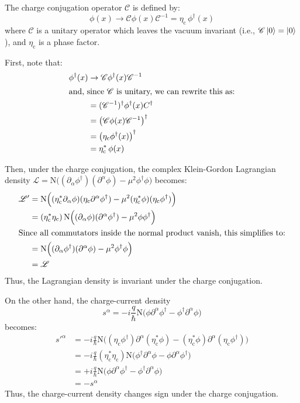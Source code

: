 \documentclass[letterpaper,12pt]{article}
\newenvironment{problem}{\subsection{}\begin{adjustwidth}{0.25in}{}\vspace{-\baselineskip}}{\end{adjustwidth}}
\newcommand{\lagr}{\mathscr{L}}
\begin{document}
\begin{problem}
The charge conjugation operator $\mathscr{C}$ is defined by:
\begin{equation*}
	\phi(x) \longrightarrow \mathscr{C}\phi(x)\mathscr{C}^{-1} = \eta_\text{c} \, \phi^\dagger(x)
\end{equation*}
where $\mathscr{C}$ is a unitary operator which leaves the vacuum invariant (i.e., $\mathscr{C}\ket{0} = \ket{0}$), and $\eta_\text{c}$ is a phase factor.

First, note that:
\begin{align*}
	\phi^\dagger(x) &\rightarrow \mathscr{C}\phi^\dagger(x)\mathscr{C}^{-1}	\\
\intertext{and, since $\mathscr{C}$ is unitary, we can rewrite this as:}
	&= (\mathscr{C}^{-1})^\dagger \phi^\dagger(x) C^\dagger	\\
	&= \left(\mathscr{C} \phi(x) \mathscr{C}^{-1}\right)^\dagger	\\
	&= \left(\eta_\text{c} \phi^\dagger(x)\right)^\dagger	\\
	&= \eta_\text{c}^* \, \phi(x)
\end{align*}

Then, under the charge conjugation, the complex Klein-Gordon Lagrangian density $\lagr = \mathrm{N}\Big((\partial_\alpha \phi^\dagger) (\partial^\alpha \phi) - \mu^2 \phi^\dagger\phi\Big)$ becomes:
\begin{align*}
	\lagr' &= \mathrm{N}\Big((\eta^*_\text{c}\partial_\alpha \phi) (\eta_\text{c}\partial^\alpha \phi^\dagger) - \mu^2 (\eta^*_\text{c}\phi)(\eta_\text{c}\phi^\dagger) \Big)	\\
	&= \left(\eta^*_\text{c} \eta_\text{c}\right)
	\mathrm{N}\Big((\partial_\alpha \phi)(\partial^\alpha \phi^\dagger) - \mu^2 \phi\phi^\dagger \Big)	\\
	\intertext{Since all commutators inside the normal product vanish, this simplifies to:}
	&= \mathrm{N}\Big((\partial_\alpha \phi^\dagger) (\partial^\alpha \phi) - \mu^2 \phi^\dagger\phi\Big)		\\
	&= \lagr			 
\end{align*}
Thus, the Lagrangian density is invariant under the charge conjugation.


On the other hand, the charge-current density
\begin{equation*}
	s^\alpha = -i\frac{q}{\hbar} \mathrm{N}\Big(\phi \partial^\alpha\phi^\dagger - \phi^\dagger \partial^\alpha\phi\Big)
\end{equation*}
becomes:
\begin{align*}
	s'^\alpha &= -i\frac{q}{\hbar} \mathrm{N}\Big((\eta_\text{c}\phi^\dagger)\partial^\alpha(\eta^*_\text{c}\phi) - (\eta^*_\text{c}\phi)\partial^\alpha(\eta_\text{c}\phi^\dagger)\Big)	\\
	&= -i\frac{q}{\hbar} (\eta^*_\text{c}\eta_\text{c}) \mathrm{N}\Big(\phi^\dagger\partial^\alpha \phi - \phi \partial^\alpha \phi^\dagger\Big)	\\
	&= +i \frac{q}{\hbar} \mathrm{N}\Big(\phi \partial^\alpha\phi^\dagger - \phi^\dagger \partial^\alpha\phi\Big)		\\
	&= -s^\alpha			 
\end{align*}
Thus, the charge-current density changes sign under the charge conjugation.


\end{problem}
\end{document}
